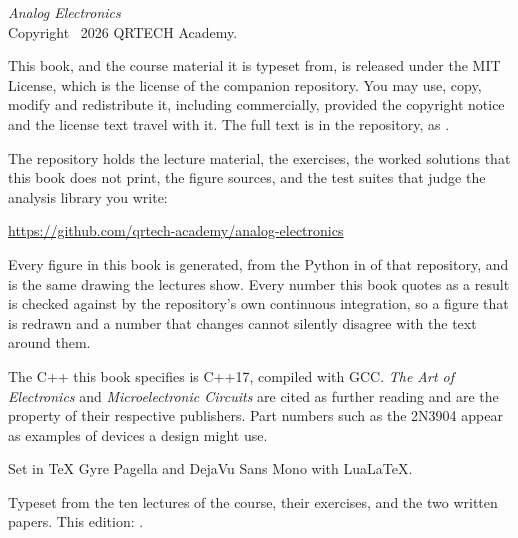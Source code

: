 \thispagestyle{empty}
\vspace*{\fill}
{\small
\noindent\textit{Analog Electronics}\\
Copyright \textcopyright\ 2026 QRTECH Academy.

\medskip
\noindent This book, and the course material it is typeset from, is released under the MIT
License, which is the license of the companion repository. You may use, copy, modify and
redistribute it, including commercially, provided the copyright notice and the license text
travel with it. The full text is in the repository, as .

\medskip
\noindent The repository holds the lecture material, the exercises, the worked solutions that
this book does not print, the figure sources, and the test suites that judge the analysis library
you write:

\medskip
\noindent\url{https://github.com/qrtech-academy/analog-electronics}

\medskip
\noindent Every figure in this book is generated, from the Python in  of that
repository, and is the same drawing the lectures show. Every number this book quotes as a result
is checked against  by the repository's own continuous integration, so a
figure that is redrawn and a number that changes cannot silently disagree with the text around
them.

\medskip
\noindent The C++ this book specifies is C++17, compiled with GCC. \textit{The Art of
Electronics} and \textit{Microelectronic Circuits} are cited as further reading and are the
property of their respective publishers. Part numbers such as the 2N3904 appear as examples of
devices a design might use.

\medskip
\noindent Set in TeX Gyre Pagella and DejaVu Sans Mono with Lua\LaTeX.

\medskip
\noindent\textcolor{muted}{Typeset from the ten lectures of the course, their exercises, and the
two written papers. This edition: \bookedition.}
\par}
\cleardoublepage
